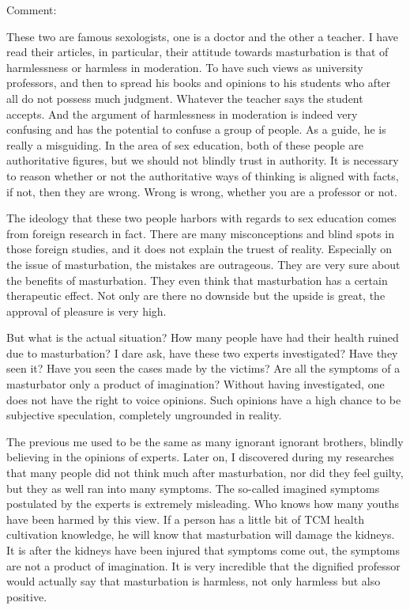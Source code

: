 \documentclass[
]{book}
\begin{document}
Comment:

These two are famous sexologists, one is a doctor and the other a teacher. I have read their articles, in particular, their attitude towards masturbation is that of harmlessness or harmless in moderation. To have such views as university professors, and then to spread his books and opinions to his students who after all do not possess much judgment. Whatever the teacher says the student accepts. And the argument of harmlessness in moderation is indeed very confusing and has the potential to confuse a group of people. As a guide, he is really a misguiding. In the area of sex education, both of these people are authoritative figures, but we should not blindly trust in authority. It is necessary to reason whether or not the authoritative ways of thinking is aligned with facts, if not, then they are wrong. Wrong is wrong, whether you are a professor or not.

The ideology that these two people harbors with regards to sex education comes from foreign research in fact. There are many misconceptions and blind spots in those foreign studies, and it does not explain the truest of reality. Especially on the issue of masturbation, the mistakes are outrageous. They are very sure about the benefits of masturbation. They even think that masturbation has a certain therapeutic effect. Not only are there no downside but the upside is great, the approval of pleasure is very high.

But what is the actual situation? How many people have had their health ruined due to masturbation? I dare ask, have these two experts investigated? Have they seen it? Have you seen the cases made by the victims? Are all the symptoms of a masturbator only a product of imagination? Without having investigated, one does not have the right to voice opinions. Such opinions have a high chance to be subjective speculation, completely ungrounded in reality.

The previous me used to be the same as many ignorant ignorant brothers, blindly believing in the opinions of experts. Later on, I discovered during my researches that many people did not think much after masturbation, nor did they feel guilty, but they as well ran into many symptoms. The so-called imagined symptoms postulated by the experts is extremely misleading. Who knows how many youths have been harmed by this view. If a person has a little bit of TCM health cultivation knowledge, he will know that masturbation will damage the kidneys. It is after the kidneys have been injured that symptoms come out, the symptoms are not a product of imagination. It is very incredible that the dignified professor would actually say that masturbation is harmless, not only harmless but also positive.
\end{document}
